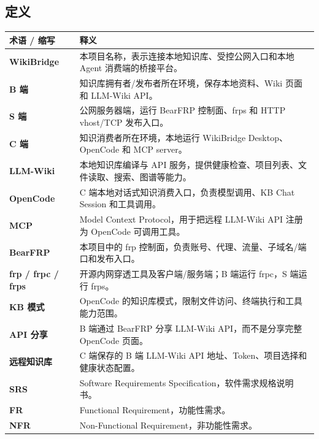 \documentclass[UTF8,a4paper,12pt,fontset=fandol]{ctexart}
\begin{document}
\subsection{定义}
\begin{longtable}{>{\bfseries}p{3.2cm}p{11.0cm}}
\toprule
术语 / 缩写 & 释义 \\
\midrule
WikiBridge & 本项目名称，表示连接本地知识库、受控公网入口和本地 Agent 消费端的桥接平台。 \\
B 端 & 知识库拥有者/发布者所在环境，保存本地资料、Wiki 页面和 LLM-Wiki API。 \\
S 端 & 公网服务器端，运行 BearFRP 控制面、frps 和 HTTP vhost/TCP 发布入口。 \\
C 端 & 知识消费者所在环境，本地运行 WikiBridge Desktop、OpenCode 和 MCP server。 \\
LLM-Wiki & 本地知识库编译与 API 服务，提供健康检查、项目列表、文件读取、搜索、图谱等能力。 \\
OpenCode & C 端本地对话式知识消费入口，负责模型调用、KB Chat Session 和工具调用。 \\
MCP & Model Context Protocol，用于把远程 LLM-Wiki API 注册为 OpenCode 可调用工具。 \\
BearFRP & 本项目中的 frp 控制面，负责账号、代理、流量、子域名/端口和发布入口。 \\
frp / frpc / frps & 开源内网穿透工具及客户端/服务端；B 端运行 frpc，S 端运行 frps。 \\
KB 模式 & OpenCode 的知识库模式，限制文件访问、终端执行和工具能力范围。 \\
API 分享 & B 端通过 BearFRP 分享 LLM-Wiki API，而不是分享完整 OpenCode 页面。 \\
远程知识库 & C 端保存的 B 端 LLM-Wiki API 地址、Token、项目选择和健康状态配置。 \\
SRS & Software Requirements Specification，软件需求规格说明书。 \\
FR & Functional Requirement，功能性需求。 \\
NFR & Non-Functional Requirement，非功能性需求。 \\
\bottomrule
\end{longtable}
\end{document}
